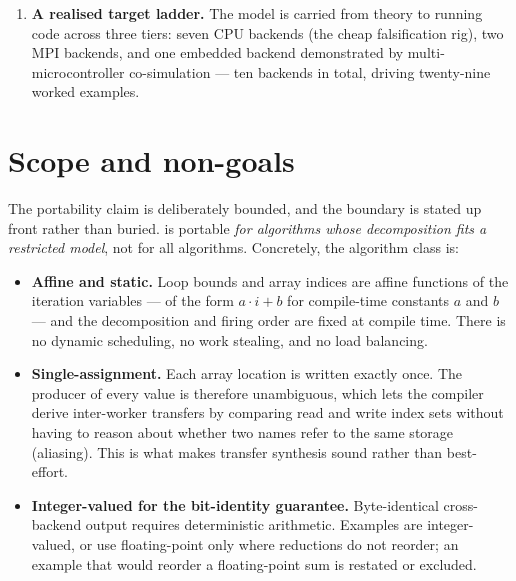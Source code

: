 \begin{enumerate}[leftmargin=*]
  \item \textbf{A realised target ladder.} The model is carried from theory to
        running code across three tiers: seven CPU backends (the cheap
        falsification rig), two MPI backends, and one embedded backend
        demonstrated by multi-microcontroller co-simulation --- ten backends in
        total, driving twenty-nine worked examples.
\end{enumerate}

\section{Scope and non-goals}\label{sec:intro-scope}

The portability claim is deliberately bounded, and the boundary is stated up
front rather than buried. \nuc{} is portable \emph{for algorithms whose
decomposition fits a restricted model}, not for all algorithms. Concretely, the
algorithm class is:

\begin{itemize}[leftmargin=*]
  \item \textbf{Affine and static.} Loop bounds and array indices are affine
        functions of the iteration variables --- of the form $a\cdot i + b$ for
        compile-time constants $a$ and $b$ --- and the decomposition and firing
        order are fixed at compile time. There is no dynamic scheduling, no work
        stealing, and no load balancing.
  \item \textbf{Single-assignment.} Each array location is written exactly once.
        The producer of every value is therefore unambiguous, which lets the
        compiler derive inter-worker transfers by comparing read and write index
        sets without having to reason about whether two names refer to the same
        storage (aliasing). This is what makes transfer synthesis sound rather
        than best-effort.
  \item \textbf{Integer-valued for the bit-identity guarantee.} Byte-identical
        cross-backend output requires deterministic arithmetic. Examples are
        integer-valued, or use floating-point only where reductions do not
        reorder; an example that would reorder a floating-point sum is restated
        or excluded.
\end{itemize}

